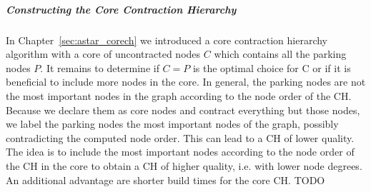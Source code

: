 \subparagraph{Constructing the Core Contraction Hierarchy}
In Chapter~\ref{sec:astar_corech} we introduced a core contraction hierarchy algorithm with a core of uncontracted nodes $C$ which contains all the parking nodes $P$. It remains to determine if $C=P$ is the optimal choice for C or if it is beneficial to include more nodes in the core. In general, the parking nodes are not the most important nodes in the graph according to the node order of the CH. Because we declare them as core nodes and contract everything but those nodes, we label the parking nodes the most important nodes of the graph, possibly contradicting the computed node order. This can lead to a CH of lower quality. The idea is to include the most important nodes according to the node order of the CH in the core to obtain a CH of higher quality, i.e. with lower node degrees. An additional advantage are shorter build times for the core CH. TODO